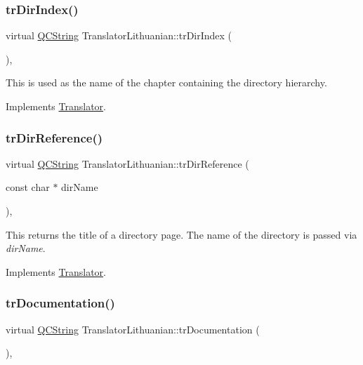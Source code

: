 \subsubsection{\texorpdfstring{trDirIndex()}{trDirIndex()}}
{\footnotesize\ttfamily virtual \mbox{\hyperlink{class_q_c_string}{Q\+C\+String}} Translator\+Lithuanian\+::tr\+Dir\+Index (\begin{DoxyParamCaption}{ }\end{DoxyParamCaption})\hspace{0.3cm}{\ttfamily [inline]}, {\ttfamily [virtual]}}

This is used as the name of the chapter containing the directory hierarchy. 

Implements \mbox{\hyperlink{class_translator}{Translator}}.

\mbox{\label{class_translator_lithuanian_a9b6cca1a05289a6d9a8b4d685af01767}} 
\subsubsection{\texorpdfstring{trDirReference()}{trDirReference()}}
{\footnotesize\ttfamily virtual \mbox{\hyperlink{class_q_c_string}{Q\+C\+String}} Translator\+Lithuanian\+::tr\+Dir\+Reference (\begin{DoxyParamCaption}\item[{const char $\ast$}]{dir\+Name }\end{DoxyParamCaption})\hspace{0.3cm}{\ttfamily [inline]}, {\ttfamily [virtual]}}

This returns the title of a directory page. The name of the directory is passed via {\itshape dir\+Name}. 

Implements \mbox{\hyperlink{class_translator}{Translator}}.

\mbox{\label{class_translator_lithuanian_a067e81d0786fb2ce8db6593d1bfd7948}} 
\subsubsection{\texorpdfstring{trDocumentation()}{trDocumentation()}}
{\footnotesize\ttfamily virtual \mbox{\hyperlink{class_q_c_string}{Q\+C\+String}} Translator\+Lithuanian\+::tr\+Documentation (\begin{DoxyParamCaption}{ }\end{DoxyParamCaption})\hspace{0.3cm}{\ttfamily [inline]}, {\ttfamily [virtual]}}


